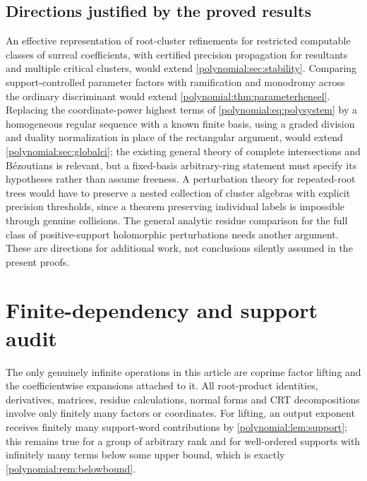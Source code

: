 \documentclass[11pt,letterpaper]{article}
\numberwithin{equation}{section}
\theoremstyle{definition}
\theoremstyle{remark}\newtheorem{remark}[theorem]{Remark}
\begin{document}
\subsection{Directions justified by the proved results}
An effective representation of root-cluster refinements for restricted
computable classes of surreal coefficients, with certified precision
propagation for resultants and multiple critical clusters, would extend
\cref{polynomial:sec:stability}. Comparing support-controlled parameter
factors with ramification and monodromy across the ordinary discriminant would
extend \cref{polynomial:thm:parameterhensel}. Replacing the coordinate-power
highest terms of \eqref{polynomial:eq:polysystem} by a homogeneous regular
sequence with a known finite basis, using a graded division and duality
normalization in place of the rectangular argument, would extend
\cref{polynomial:sec:globalci}; the existing general theory of complete
intersections and B\'ezoutians is relevant, but a fixed-basis arbitrary-ring
statement must specify its hypotheses rather than assume freeness. A
perturbation theory for repeated-root trees would have to preserve a nested
collection of cluster algebras with explicit precision thresholds, since a
theorem preserving individual labels is impossible through genuine collisions.
The general analytic residue comparison for the full class of positive-support
holomorphic perturbations needs another argument. These are directions for
additional work, not conclusions silently assumed in the present proofs.

\appendix
\section{Finite-dependency and support audit}\label{polynomial:app:support}
The only genuinely infinite operations in this article are coprime factor
lifting and the coefficientwise expansions attached to it. All root-product
identities, derivatives, matrices, residue calculations, normal forms and CRT
decompositions involve only finitely many factors or coordinates. For lifting,
an output exponent receives finitely many support-word contributions by
\cref{polynomial:lem:support}; this remains true for a group of arbitrary rank
and for well-ordered supports with infinitely many terms below some upper
bound, which is exactly \cref{polynomial:rem:belowbound}.
\end{document}
